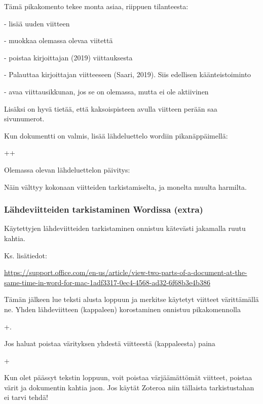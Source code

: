 \documentclass[a5paper,9pt]{scrartcl}
\begin{document}
    Tämä pikakomento tekee monta asiaa, riippuen tilanteesta:
    
    - lisää uuden viitteen
    
    - muokkaa olemassa olevaa viitettä
    
    - poistaa kirjoittajan (2019) viittauksesta
    
    - Palauttaa kirjoittajan viitteeseen (Saari, 2019). Siis edellisen käänteistoiminto
    
    - avaa viittausikkunan, jos se on olemassa, mutta ei ole aktiivinen
    
    
    Lisäksi on hyvä tietää, että kaksoispisteen \keys{:} avulla viitteen perään saa sivunumerot.
    
    Kun dokumentti on valmis, lisää lähdeluettelo wordiin pikanäppäimellä:
    
    \keys{\ctrl}++
    
    Olemassa olevan lähdeluettelon päivitys:
    
    
    Näin välttyy kokonaan viitteiden tarkistamiselta, ja monelta muulta harmilta.
    
    \subsubsection{Lähdeviitteiden tarkistaminen Wordissa (extra)}
    Käytettyjen lähdeviitteiden tarkistaminen onnistuu kätevästi jakamalla ruutu kahtia.
    
    
    
    Ks. lisätiedot:
    
    \url{https://support.office.com/en-us/article/view-two-parts-of-a-document-at-the-same-time-in-word-for-mac-1adf3317-0ec4-4568-ad32-6f68b3e4b386}
    
    Tämän jälkeen lue teksti alusta loppuun ja merkitse käytetyt viitteet värittämällä ne. Yhden lähdeviitteen (kappaleen) korostaminen onnistuu pikakomennolla
    
    +. 
    
    Jos haluat poistaa värityksen yhdestä viitteestä (kappaleesta) paina
    
    +
    
    Kun olet päässyt tekstin loppuun, voit poistaa värjäämättömät viitteet, poistaa värit ja dokumentin kahtia jaon. Jos käytät Zoteroa niin tällaista tarkistustahan ei tarvi tehdä!
    
\end{document}
